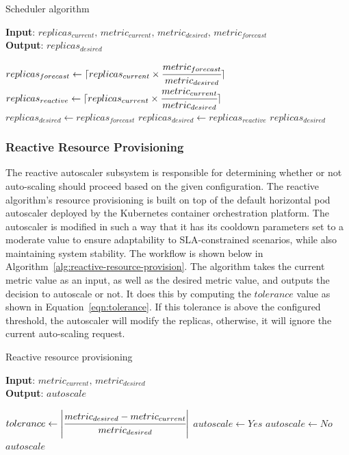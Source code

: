 \begin{algorithm}
    \caption{Scheduler algorithm}
    \label{alg:scheduling-logic-daemon}
    \textbf{Input}: $replicas_{current},\, metric_{current},\, metric_{desired},\, metric_{forecast}$\\
    \textbf{Output}: $replicas_{desired}$
    \begin{algorithmic}
        \State $replicas_{forecast} \gets \lceil replicas_{current} \times \cfrac{metric_{forecast}}{metric_{desired}}\rceil$
        \State $replicas_{reactive} \gets \lceil replicas_{current} \times \cfrac{metric_{current}}{metric_{desired}}\rceil$
            \State $replicas_{desired} \gets replicas_{forecast}$
        \Else
            \State $replicas_{desired} \gets replicas_{reactive}$
        \EndIf
        \State \Return $replicas_{desired}$
    \end{algorithmic}
\end{algorithm}

\subsubsection{Reactive Resource Provisioning}

The reactive autoscaler subsystem is responsible for determining whether or not auto-scaling should proceed based on the given configuration. The reactive algorithm's resource provisioning is built on top of the default horizontal pod autoscaler deployed by the Kubernetes container orchestration platform. The autoscaler is modified in such a way that it has its cooldown parameters set to a moderate value to ensure adaptability to SLA-constrained scenarios, while also maintaining system stability. The workflow is shown below in Algorithm~\ref{alg:reactive-resource-provision}. The algorithm takes the current metric value as an input, as well as the desired metric value, and outputs the decision to autoscale or not. It does this by computing the $tolerance$ value as shown in Equation~\ref{eqn:tolerance}. If this tolerance is above the configured threshold, the autoscaler will modify the replicas, otherwise, it will ignore the current auto-scaling request.\par

\begin{algorithm}
    \caption{Reactive resource provisioning}
    \label{alg:reactive-resource-provision}
    \textbf{Input}: $metric_{current},\, metric_{desired}$\\
    \textbf{Output}: $autoscale$
    \begin{algorithmic}
        \State $tolerance \gets \abs{ \cfrac{metric_{desired} - metric_{current}}{metric_{desired}} }$
            \State $autoscale \gets Yes$
        \Else
            \State $autoscale \gets No$
        \EndIf
        \State \Return $autoscale$
    \end{algorithmic}
\end{algorithm}

